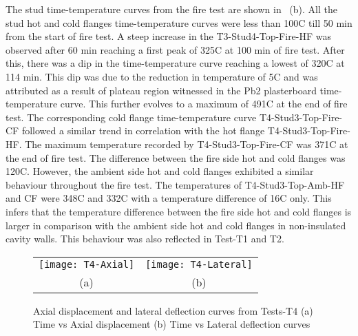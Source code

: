 The stud time-temperature curves from the fire test are shown in ~(b). All the stud hot and cold flanges time-temperature curves were less than 100\degree C till 50 min from the start of fire test. A steep increase in the T3-Stud4-Top-Fire-HF was observed after 60 min reaching a first peak of 325\degree C at 100 min of fire test. After this, there was a dip in the time-temperature curve reaching a lowest of 320\degree C at 114 min. This dip was due to the reduction in temperature of 5\degree C and was attributed as a result of plateau region witnessed in the Pb2 plasterboard time-temperature curve. This further evolves to a maximum of 491\degree C at the end of fire test. The corresponding cold flange time-temperature curve T4-Stud3-Top-Fire-CF followed a similar trend in correlation with the hot flange T4-Stud3-Top-Fire-HF. The maximum temperature recorded by T4-Stud3-Top-Fire-CF was 371\degree C at the end of fire test. The difference between the fire side hot and cold flanges was 120\degree C. However, the ambient side hot and cold flanges exhibited a similar behaviour throughout the fire test. The temperatures of T4-Stud3-Top-Amb-HF and CF were 348\degree C and 332\degree C with a temperature difference of 16\degree C only. This infers that the temperature difference between the fire side hot and cold flanges is larger in comparison with the ambient side hot and cold flanges in non-insulated cavity walls. This behaviour was also reflected in Test-T1 and T2.
\begin{figure}[!htbp]
	\centering
		\begin{tabular}{cc}
			\texttt{[image: T4-Axial]} & \texttt{[image: T4-Lateral]} \\
			(a) & (b) \\
		\end{tabular} 
		\caption{Axial displacement and lateral deflection curves from Tests-T4 (a) Time vs Axial displacement (b) Time vs Lateral deflection curves}
		\label{fig:T4-Axial-Lateral}
\end{figure}

